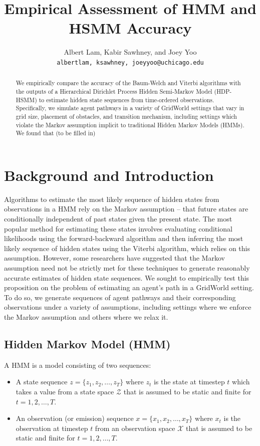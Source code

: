\documentclass{article}
\title{Empirical Assessment of HMM and HSMM Accuracy}
\author{%
  Albert Lam, Kabir Sawhney, and Joey Yoo \\
  \texttt{albertlam, ksawhney, joeyyoo@uchicago.edu} \\
}
\begin{document}

\maketitle

\begin{abstract}
We empirically compare the accuracy of the Baum-Welch and Viterbi algorithms with the outputs of a Hierarchical Dirichlet Process Hidden Semi-Markov Model (HDP-HSMM) to estimate hidden state sequences from time-ordered observations. Specifically, we simulate agent pathways in a variety of GridWorld settings that vary in grid size, placement of obstacles, and transition mechanism, including settings which violate the Markov assumption implicit to traditional Hidden Markov Models (HMMs). We found that (to be filled in)
\end{abstract}

\section{Background and Introduction}

Algorithms to estimate the most likely sequence of hidden states from observations in a HMM rely on the Markov assumption -- that future states are conditionally independent of past states given the present state. The most popular method for estimating these states involves evaluating conditional likelihoods using the forward-backward algorithm and then inferring the most likely sequence of hidden states using the Viterbi algorithm, which relies on this assumption. However, some researchers have suggested that the Markov assumption need not be strictly met for these techniques to generate reasonably accurate estimates of hidden state sequences. We sought to empirically test this proposition on the problem of estimating an agent's path in a GridWorld setting. To do so, we generate sequences of agent pathways and their corresponding observations under a variety of assumptions, including settings where we enforce the Markov assumption and others where we relax it.

\subsection{Hidden Markov Model (HMM)}
A HMM is a model consisting of two sequences:
\begin{itemize}
  \item A state sequence $z = \{z_1, z_2, \dots, z_T\}$ where $z_t$ is the state at timestep $t$ which takes a value from a state space $\mathcal{Z}$ that is assumed to be static and finite for $t = 1, 2, \dots, T$.
  \item An observation (or emission) sequence $x = \{x_1, x_2, \dots, x_T\}$ where $x_t$ is the observation at timestep $t$ from an observation space $\mathcal{X}$ that is assumed to be static and finite for $t = 1, 2, \dots, T$.
\end{itemize}
\end{document}
